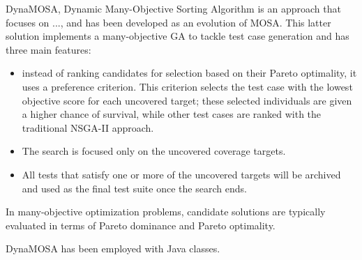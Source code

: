 DynaMOSA, Dynamic Many-Objective Sorting Algorithm \cite{DBLP:journals/tse/PanichellaKT18} is an approach that focuses on ..., and has been developed as an evolution of MOSA. This latter solution implements a many-objective GA to tackle test case generation and has three main features: 
\begin{itemize}
    \item instead of ranking candidates for selection based on their Pareto optimality, it uses a preference criterion. This criterion selects the test case with the lowest objective score for each uncovered target; these selected individuals are given a higher chance of survival, while other test cases are ranked with the traditional NSGA-II approach.
    \item The search is focused only on the uncovered coverage targets.
    \item All tests that satisfy one or more of the uncovered targets will be archived and used as the final test suite once the search ends.
\end{itemize}

In many-objective optimization problems, candidate solutions are typically evaluated in terms of Pareto dominance and Pareto optimality.

DynaMOSA has been employed with Java classes.

